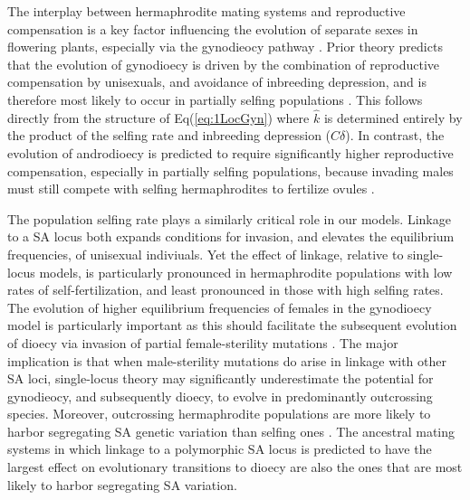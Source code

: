 \documentclass[9pt,twocolumn,twoside,lineno]{gsajnl}
\begin{document}
The interplay between hermaphrodite mating systems and reproductive compensation is a key factor influencing the evolution of separate sexes in flowering plants, especially via the gynodieocy pathway \citep{Darwin1877,Charlesworth1978a}. Prior theory predicts that the evolution of gynodioecy is driven by the combination of reproductive compensation by unisexuals, and avoidance of inbreeding depression, and is therefore most likely to occur in partially selfing populations \citep{Lewis1942,Lloyd1975,Charlesworth1978a,KaferPannell2017}. This follows directly from the structure of Eq(\ref{eq:1LocGyn}) where $\hat{k}$ is determined entirely by the product of the selfing rate and inbreeding depression ($C \delta$). In contrast, the evolution of androdioecy is predicted to require significantly higher reproductive compensation, especially in partially selfing populations, because invading males must still compete with selfing hermaphrodites to fertilize ovules \citep{Charlesworth1978b,KaferPannell2017}. 

The population selfing rate plays a similarly critical role in our models. Linkage to a SA locus both expands conditions for invasion, and elevates the equilibrium frequencies, of unisexual indiviuals. Yet the effect of linkage, relative to single-locus models, is particularly pronounced in hermaphrodite populations with low rates of self-fertilization, and least pronounced in those with high selfing rates. The evolution of higher equilibrium frequencies of females in the gynodioecy model is particularly important as this should facilitate the subsequent evolution of dioecy via invasion of partial female-sterility mutations \citep{Charlesworth1978a,Charlesworth1978b,Charlesworth1999,Charlesworth2006}. The major implication is that when male-sterility mutations do arise in linkage with other SA loci, single-locus theory may significantly underestimate the potential for gynodieocy, and subsequently dioecy, to evolve in predominantly outcrossing species. Moreover, outcrossing hermaphrodite populations are more likely to harbor segregating SA genetic variation than selfing ones \citep{JordanConnallon2014,Olito2017}. The ancestral mating systems in which linkage to a polymorphic SA locus is predicted to have the largest effect on evolutionary transitions to dioecy are also the ones that are most likely to harbor segregating SA variation. 
\end{document}
